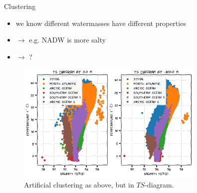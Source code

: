 \documentclass[xcolor=x11names,compress]{beamer}
\renewcommand{\(}{\begin{columns}}
\renewcommand{\)}{\end{columns}}
\newcommand{\<}[1]{\begin{column}{#1}}
\renewcommand{\>}{\end{column}}
\begin{document}

\begin{frame}{Clustering}

\begin{itemize}
  \item we know different watermasses have different properties
  \item[] $\to$ e.g. NADW is more salty
  \item[] $\to$ ?
\end{itemize}

\begin{figure}
  \includegraphics[width=0.8\textwidth]{argo_data_cluster_TS}
  \caption{Artificial clustering as above, but in $TS$-diagram.}
\end{figure}

\end{frame}

\end{document}
